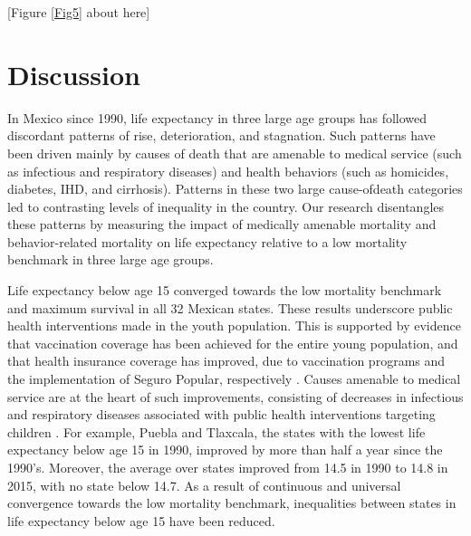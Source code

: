 \documentclass{bmcart}
\begin{document}
\begin{center}
[Figure \ref{Fig5} about here]
\end{center}



\section*{Discussion}
In Mexico since 1990, life expectancy in three large age groups has followed discordant patterns of rise, deterioration, and stagnation. Such patterns have been driven mainly by causes of death that are amenable to medical service (such as infectious and respiratory diseases) and health behaviors (such as homicides, diabetes, IHD, and cirrhosis). Patterns in these two large cause-ofdeath categories led to contrasting levels of inequality in the country. Our research disentangles these patterns by measuring the impact of medically amenable mortality and behavior-related mortality on life expectancy relative to a low mortality benchmark in three large age groups. %

Life expectancy below age 15 converged towards the low mortality benchmark and maximum survival in all 32 Mexican states. These results underscore public health interventions made in the youth population. This is supported by evidence that vaccination coverage has been achieved for the entire young population, and that health insurance coverage has improved, due to vaccination programs and the implementation of Seguro Popular, respectively \cite{urquieta2015evolution}. Causes amenable to medical service are at the heart of such improvements, consisting of decreases in infectious and respiratory diseases associated with public health interventions targeting children \cite{sepulveda2006}. For example, Puebla and Tlaxcala, the states with the lowest life expectancy below age 15 in 1990, improved by more than half a year since the 1990's. Moreover, the average over states improved from 14.5 in 1990 to 14.8 in 2015, with no state below 14.7. As a result of continuous and universal convergence towards the low mortality benchmark, inequalities between states in life expectancy below age 15 have been reduced. 
\end{document}
